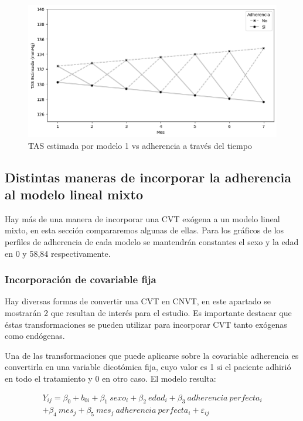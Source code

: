 \documentclass[spanish]{article}
\numberwithin{figure}{subsection}
\numberwithin{equation}{subsection}
\numberwithin{table}{subsection}
\begin{document}
\begin{figure}[H]
	\centering
	\includegraphics[scale=0.5]{img/modelo_1.png}
	\caption{TAS estimada por modelo 1 vs adherencia a través del tiempo}
	\label{modelo_1_plot}
\end{figure}

\subsection{Distintas maneras de incorporar la adherencia al modelo lineal mixto}

Hay más de una manera de incorporar una CVT exógena a un modelo lineal mixto, en
esta sección compararemos algunas de ellas. Para los gráficos de los perfiles de
adherencia de cada modelo se mantendrán constantes el sexo y la edad en 0 y
58,84 respectivamente.

\subsubsection{Incorporación de covariable fija}

Hay diversas formas de convertir una CVT en CNVT, en este apartado se mostrarán
2 que resultan de interés para el estudio. Es importante destacar que éstas
transformaciones se pueden utilizar para incorporar CVT tanto exógenas como
endógenas.

Una de las transformaciones que puede aplicarse sobre la covariable adherencia
es convertirla en una variable dicotómica fija, cuyo valor es 1 si el paciente
adhirió en todo el tratamiento y 0 en otro caso. El modelo resulta:

\begin{multline}
	\label{modelo_2}
	Y_{ij} = \beta_0 + b_{0i} + \beta_1\ sexo_i + \beta_2\ edad_i + \beta_3\ adherencia\ perfecta_i \\
	+ \beta_4\ mes_j + \beta_5\ mes_j\ adherencia\ perfecta_i + \varepsilon_{ij}
\end{multline}
\end{document}

